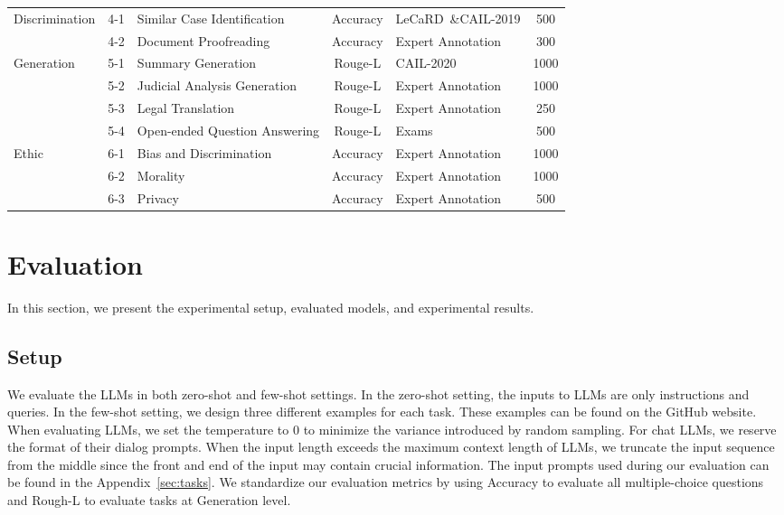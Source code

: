 \begin{table*}[t]
\begin{tabular}{lclclc}
\multirow{2}{*}{Discrimination}  & 4-1 & Similar Case Identification   & Accuracy    & LeCaRD~\cite{ma2021lecard}\&CAIL-2019 & 500      \\
                                 & 4-2 & Document Proofreading         & Accuracy    & Expert Annotation & 300      \\ \hline
\multirow{4}{*}{Generation}      & 5-1 & Summary Generation            & Rouge-L   & CAIL-2020         & 1000     \\
                                 & 5-2 & Judicial Analysis Generation  & Rouge-L   & Expert Annotation & 1000     \\
                                 & 5-3 & Legal Translation             & Rouge-L   & Expert Annotation & 250      \\
                                 & 5-4 & Open-ended Question Answering & Rouge-L   & Exams             & 500      \\ \hline
\multirow{3}{*}{Ethic}           & 6-1 & Bias and Discrimination       & Accuracy    & Expert Annotation & 1000     \\
                                 & 6-2 & Morality                      & Accuracy    & Expert Annotation & 1000     \\
                                 & 6-3 & Privacy                       & Accuracy    & Expert Annotation & 500      \\ \hline
\end{tabular}
\vspace{-3mm}

\label{overview}
\vspace{-4mm}
\end{table*}

\section{Evaluation}
In this section, we present the experimental setup, evaluated models, and experimental results.
\subsection{Setup}
We evaluate the LLMs in both zero-shot and few-shot settings. In the zero-shot setting, the inputs to LLMs are only instructions and queries. In the few-shot setting, we design three different examples for each task. These examples can be found on the GitHub website. When evaluating LLMs, we set the temperature to 0 to minimize the variance introduced by random sampling. For chat LLMs, we reserve the format of their dialog prompts. When the input length exceeds the maximum context length of LLMs, we truncate the input sequence from the middle since the front and end of the input may contain crucial information. The input prompts used during our evaluation can be found in the Appendix~\ref{sec:tasks}. 
We standardize our evaluation metrics by using Accuracy to evaluate all multiple-choice questions and Rough-L to evaluate tasks at Generation level.

